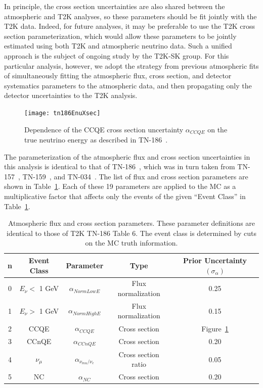 In principle, the cross section uncertainties are also shared between the
atmospheric and T2K analyses, so these parameters should be fit jointly with
the T2K data. Indeed, for future analyses, it may be preferable to use the T2K
cross section parameterization, which would allow these parameters to be
jointly estimated using both T2K and atmospheric neutrino data. Such a unified
approach is the subject of ongoing study by the T2K-SK group. For this
particular analysis, however, we adopt the strategy from previous atmospheric fits of
simultaneously fitting the atmospheric flux, cross section, and detector
systematics parameters to the atmospheric data, and then propagating only the
detector uncertainties to the T2K analysis. 

\begin{figure}[h]
  \begin{center}
    \texttt{[image: tn186EnuXsec]}
  \end{center}
  \caption{Dependence of the CCQE cross section uncertainty $\alpha_{CCQE}$ on
  the true neutrino energy as described in TN-186~\cite{tn186}.}
  \label{fig:alphaccqe}
\end{figure}

The parameterization of the atmospheric flux and cross section uncertainties in
this analysis is identical to that of TN-186~\cite{tn186}, which was in turn taken from
TN-157~\cite{tn157}, TN-159~\cite{tn159}, and TN-034~\cite{tn034}. The list of
flux and cross section parameters are shown in Table~\ref{tab:alpha}.  Each of
these 19 parameters are applied to the MC as a multiplicative factor that
affects only the events of the given ``Event Class'' in Table~\ref{tab:alpha}.

\begin{table}
  \centering
  \begin{tabular}{c c | c | c | c }
    \hline\hline
    n & Event Class & Parameter & Type & Prior Uncertainty $(\sigma_{\alpha})$ \\
    \hline 
    0 & $E_{\nu} <$ 1 GeV & $\alpha_{NormLowE}$ & Flux normalization & 0.25 \\
    1 & $E_{\nu} >$ 1 GeV & $\alpha_{NormHighE}$ & Flux normalization & 0.15 \\
    2 & CCQE & $\alpha_{CCQE}$ & Cross section & Figure~\ref{fig:alphaccqe} \\
    3 & CCnQE & $\alpha_{CCnQE}$ & Cross section & 0.20 \\
    4 & $\nu_{\mu}$ & $\alpha_{\nu_{mu}/\nu_{e}}$ & Cross section ratio & 0.05 \\
    5 & NC & $\alpha_{NC}$ & Cross section & 0.20 \\
    \hline\hline
  \end{tabular}
  \caption{Atmospheric flux and cross section parameters.  These parameter
  definitions are identical to those of T2K TN-186 Table 6. The event class is
  determined by cuts on the MC truth information.}
  \label{tab:alpha}
\end{table}




